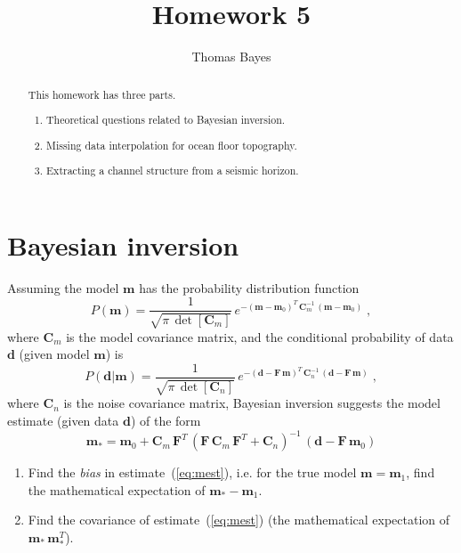 \author{Thomas Bayes}
\title{Homework 5}

\begin{abstract}
  This homework has three parts. 
  \begin{enumerate}
  \item Theoretical questions related to Bayesian inversion.
  \item Missing data interpolation for ocean floor topography.
  \item Extracting a channel structure from a seismic horizon.
  \end{enumerate}
\end{abstract}

\section{Bayesian inversion}

Assuming the model $\mathbf{m}$ has the probability distribution function 
\begin{equation}
\label{eq:pm}
P(\mathbf{m}) = \frac{1}{\sqrt{\pi\,\det[\mathbf{C}_m]}}\,e^{-(\mathbf{m}-\mathbf{m}_0)^T\,\mathbf{C}_m^{-1}\,(\mathbf{m}-\mathbf{m}_0)}\;,
\end{equation}
where $\mathbf{C}_m$ is the model covariance matrix,
and the conditional probability of data $\mathbf{d}$ (given model $\mathbf{m}$) is
\begin{equation}
\label{eq:pdm}
P(\mathbf{d}|\mathbf{m}) = \frac{1}{\sqrt{\pi\,\det[\mathbf{C}_n]}}\,e^{-(\mathbf{d}-\mathbf{F}\,\mathbf{m})^T\,\mathbf{C}_n^{-1}\,(\mathbf{d}-\mathbf{F}\,\mathbf{m})}\;,
\end{equation}
where $\mathbf{C}_n$ is the noise covariance matrix, Bayesian inversion suggests the model estimate (given data $\mathbf{d}$) of the form
\begin{equation}
\label{eq:mest}
\mathbf{m}_{*} = \mathbf{m}_0 + 
\mathbf{C}_m\,\mathbf{F}^T\,\left(\mathbf{F}\,\mathbf{C}_m\,\mathbf{F}^T + \mathbf{C}_n\right)^{-1}\,\left(\mathbf{d} - \mathbf{F}\,\mathbf{m}_0\right)
\end{equation} 

\begin{enumerate}
\item Find the \emph{bias} in estimate~(\ref{eq:mest}), i.e. for the true model $\mathbf{m}=\mathbf{m}_1$, find the mathematical expectation of $\mathbf{m}_{*}-\mathbf{m}_1$.
\item Find the covariance of estimate~(\ref{eq:mest}) (the mathematical expectation of $\mathbf{m}_{*}\,\mathbf{m}_{*}^T$).
\end{enumerate}

